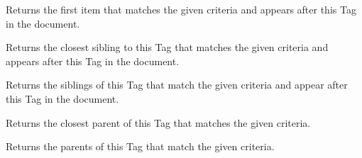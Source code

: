 \documentclass[letterpaper,10pt,english]{sphinxmanual}
\begin{document}
\begin{fulllineitems}
\begin{fulllineitems}
\label{SamPy.parsing:SamPy.parsing.BeautifulSoup.PageElement.findNext}
Returns the first item that matches the given criteria and
appears after this Tag in the document.

\end{fulllineitems}



\begin{fulllineitems}
\label{SamPy.parsing:SamPy.parsing.BeautifulSoup.PageElement.findNextSibling}
Returns the closest sibling to this Tag that matches the
given criteria and appears after this Tag in the document.

\end{fulllineitems}



\begin{fulllineitems}
\label{SamPy.parsing:SamPy.parsing.BeautifulSoup.PageElement.findNextSiblings}
Returns the siblings of this Tag that match the given
criteria and appear after this Tag in the document.

\end{fulllineitems}



\begin{fulllineitems}
\label{SamPy.parsing:SamPy.parsing.BeautifulSoup.PageElement.findParent}
Returns the closest parent of this Tag that matches the given
criteria.

\end{fulllineitems}



\begin{fulllineitems}
\label{SamPy.parsing:SamPy.parsing.BeautifulSoup.PageElement.findParents}
Returns the parents of this Tag that match the given
criteria.


\end{fulllineitems}
\end{fulllineitems}
\end{document}
